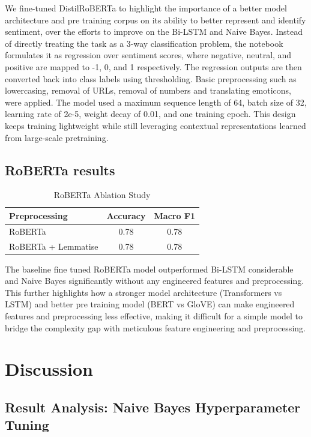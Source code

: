 \documentclass[11pt]{article}
\begin{document}
We fine-tuned DistilRoBERTa to highlight the importance of a better model architecture and pre training corpus on its ability to better represent and identify sentiment, over the efforts to improve on the Bi-LSTM and Naive Bayes. 
Instead of directly treating the task as a 3-way classification problem, the notebook formulates it as regression over sentiment scores, where negative, neutral, and positive are mapped to -1, 0, and 1 respectively. 
The regression outputs are then converted back into class labels using thresholding.
Basic preprocessing such as lowercasing, removal of URLs, removal of numbers and translating emoticons, were applied.
The model used a maximum sequence length of 64, batch size of 32, learning rate of 2e-5, weight decay of 0.01, and one training epoch. This design keeps training lightweight while still leveraging contextual representations learned from large-scale pretraining.
\subsection{RoBERTa results}

\begin{table}[h]
\centering
\renewcommand{\arraystretch}{1.2}
\begin{tabular}{p{3cm} c c} 
\hline
\textbf{Preprocessing} & \textbf{Accuracy} & \textbf{Macro F1} \\
\hline
RoBERTa  & 0.78 & 0.78 \\
RoBERTa + Lemmatise        & 0.78 & 0.78 \\
\hline
\end{tabular}
\caption{RoBERTa Ablation Study}
\label{tab:roberta_ablation}
\end{table}


The baseline fine tuned RoBERTa model outperformed Bi-LSTM considerable and Naive Bayes significantly without any engineered features and preprocessing. This further highlights how a stronger model architecture (Transformers vs LSTM) and better pre training model (BERT vs GloVE) can make
engineered features and preprocessing less effective, making it difficult for a simple model to bridge the complexity gap with meticulous feature engineering and preprocessing. 

\section{Discussion}

\subsection{Result Analysis: Naive Bayes Hyperparameter Tuning}
\end{document}
